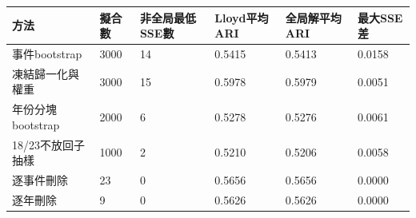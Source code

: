 \begin{tabular}{llllll}
\hline
方法 & 擬合數 & 非全局最低SSE數 & Lloyd平均ARI & 全局解平均ARI & 最大SSE差 \\
\hline
事件bootstrap & 3000 & 14 & 0.5415 & 0.5413 & 0.0158 \\
凍結歸一化與權重 & 3000 & 15 & 0.5978 & 0.5979 & 0.0051 \\
年份分塊bootstrap & 2000 & 6 & 0.5278 & 0.5276 & 0.0061 \\
18/23不放回子抽樣 & 1000 & 2 & 0.5210 & 0.5206 & 0.0058 \\
逐事件刪除 & 23 & 0 & 0.5656 & 0.5656 & 0.0000 \\
逐年刪除 & 9 & 0 & 0.5626 & 0.5626 & 0.0000 \\
\hline
\end{tabular}